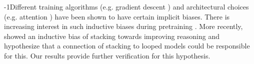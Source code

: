 \looseness-1Different training algorithms (e.g. gradient descent \citep{soudry2018implicit}) and architectural choices (e.g. attention \citep{edelman2022inductive}) have been shown to have certain implicit biases. There is increasing interest in such inductive biases during pretraining \citep{saunshi22understanding,liu2023same}. More recently, \citet{saunshi2024inductive} showed an inductive bias of stacking \citep{reddi2023efficient} towards improving reasoning and hypothesize that a connection of stacking to looped models could be responsible for this. Our results provide further verification for this hypothesis.


\vspace{-0.1in}





